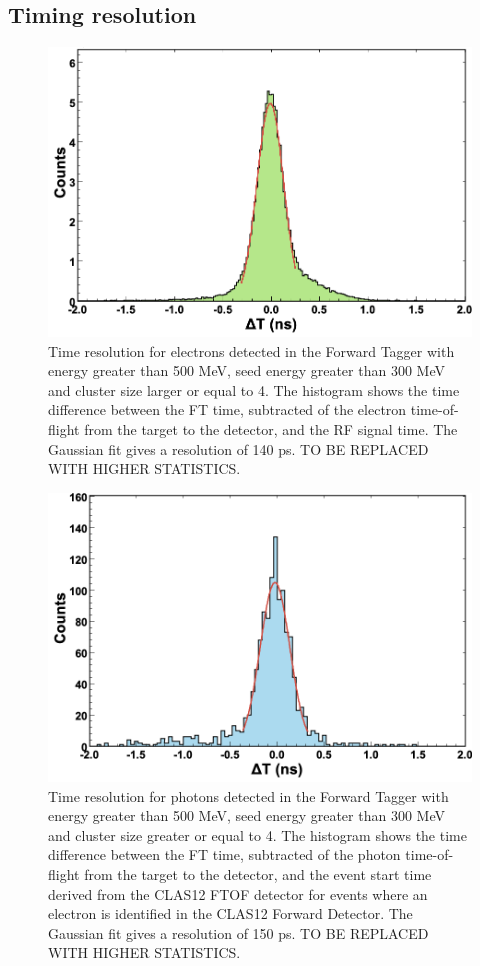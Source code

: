 \subsection{Timing resolution}
\begin{figure}[h]
\includegraphics[height=0.6\columnwidth]{fig/ft_electron_time.png}
\caption{Time resolution for electrons detected in the Forward Tagger with energy greater than 500 MeV, seed energy greater than 300 MeV and cluster size larger or equal to 4. The histogram shows the time difference between the FT time, subtracted of the electron time-of-flight from the target to the detector, and the RF signal time. The Gaussian fit gives a resolution of 140 ps. TO BE REPLACED WITH HIGHER STATISTICS.}
\label{fig:electron_time}
\end{figure}
\begin{figure}[h]
\includegraphics[height=0.6\columnwidth]{fig/ft_gamma_time.png}
\caption{Time resolution for photons detected in the Forward Tagger with energy greater than 500 MeV, seed energy greater than 300 MeV and cluster size greater or equal to 4. The histogram shows the time difference between the FT time, subtracted of the photon time-of-flight from the target to the detector, and the event start time derived from the CLAS12 FTOF detector for events where an electron is identified in the CLAS12 Forward Detector. The Gaussian fit gives a resolution of 150 ps. TO BE REPLACED WITH HIGHER STATISTICS.}
\label{fig:gamma_time}
\end{figure}
